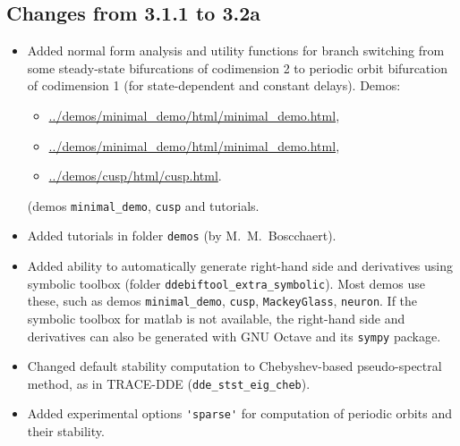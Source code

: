 \documentclass[10pt]{scrartcl}
\newcommand{\blist}[1]{\mbox{\lstinline!#1!}}
\begin{document}
\subsection{Changes from 3.1.1 to 3.2a}
\label{sec:v311to32a}
\begin{itemize}
\item Added normal form analysis and utility functions for branch
  switching from some steady-state bifurcations of codimension 2 to
  periodic orbit bifurcation of codimension 1 (for state-dependent and
  constant delays). Demos:
  \begin{itemize}
  \item \url{../demos/minimal_demo/html/minimal_demo.html},
  \item \url{../demos/minimal_demo/html/minimal_demo.html},
  \item \url{../demos/cusp/html/cusp.html}.
  \end{itemize}
(demos \texttt{minimal\_demo}, \texttt{cusp} and tutorials.
\item Added tutorials in folder \texttt{demos} (by M.~M.~Boscchaert).
\item Added ability to automatically generate right-hand side and
  derivatives using symbolic toolbox (folder
  \texttt{ddebiftool\_extra\_symbolic}). Most demos use these, such as
  demos \texttt{minimal\_demo}, \texttt{cusp}, \texttt{MackeyGlass},
  \texttt{neuron}. If the symbolic toolbox for matlab is not
  available, the right-hand side and derivatives can also be generated
  with GNU Octave and its \texttt{sympy} package.
\item Changed default stability computation to Chebyshev-based
  pseudo-spectral method, as in TRACE-DDE \cite{breda09}
  (\blist{dde_stst_eig_cheb}).
\item Added experimental options \blist{'sparse'} for computation of
  periodic orbits and their stability.
\end{itemize}
\end{document}
